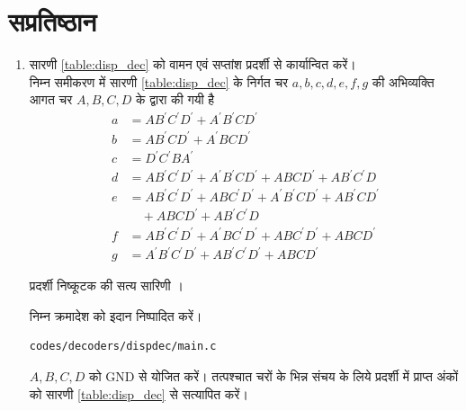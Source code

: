 \documentclass[journal,12pt,twocolumn]{IEEEtran}
\renewcommand\thesection{\arabic{section}}
\begin{document}
\section{सप्रतिष्ठान}
\renewcommand{\theequation}{\theenumi}
\renewcommand{\thefigure}{\theenumi}
\begin{enumerate}[label=\thesection.\arabic*.,ref=\thesection.\theenumi]



\item सारणी \ref{table:disp_dec} को वामन एवं सप्तांश प्रदर्शी से कार्यान्वित करें।
\\
\solution निम्न समीकरण में  सारणी \ref{table:disp_dec}  के निर्गत चर  $a,b,c,d,e,f,g$ की अभिव्यक्ति आगत चर $A,B,C,D$ के द्वारा की गयी है
%
\begin{align}
\label{eq:disp_a}
a &= AB^{\prime}C^{\prime}D^{\prime}+A^{\prime}B^{\prime}CD^{\prime}
\\
\label{eq:disp_b}
b &= AB^{\prime}CD^{\prime}+A^{\prime}BCD^{\prime}
\\
\label{eq:disp_c}
c &= {D}^{\prime}{C}^{\prime}B{A}^{\prime}
\\
d &= AB^{\prime}C^{\prime}D^{\prime}+A^{\prime}B^{\prime}CD^{\prime}+ABCD^{\prime}+AB^{\prime}C^{\prime}D
\label{eq:disp_d}
\\
e &= AB^{\prime}C^{\prime}D^{\prime}+ABC^{\prime}D^{\prime}+A^{\prime}B^{\prime}CD^{\prime}+AB^{\prime}CD^{\prime}
\nonumber \\
&\quad +ABCD^{\prime}+AB^{\prime}C^{\prime}D
\label{eq:disp_e}
\\
f &= AB^{\prime}C^{\prime}D^{\prime}+A^{\prime}BC^{\prime}D^{\prime}+ABC^{\prime}D^{\prime}+ABCD^{\prime}
\label{eq:disp_f}
\\
g &= A^{\prime}B^{\prime}C^{\prime}D^{\prime}+AB^{\prime}C^{\prime}D^{\prime}+ABCD^{\prime}
\label{eq:disp_g}
\end{align}
\begin{table}
\centering

\caption{प्रदर्शी निष्कूटक की सत्य सारिणी ।}
\label{table:disp_dec}
\end{table}
%
निम्न क्रमादेश को इदान निष्पादित करें।
\begin{lstlisting}
codes/decoders/dispdec/main.c
\end{lstlisting}
$A, B, C, D$ को GND से योजित करें।  तत्पश्चात चरों के भिन्न संचय के लिये प्रदर्शी में प्राप्त अंकों को सारणी \ref{table:disp_dec}  से सत्यापित करें।



\end{enumerate}
\end{document}

